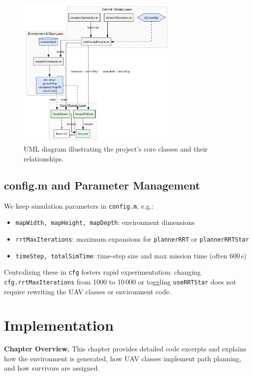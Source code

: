 \documentclass[12pt,a4paper]{report}
\begin{document}
\begin{figure}[H]
    \centering
    \includegraphics[width=0.7\textwidth]{figures/UML.png}
    \caption{UML diagram illustrating the project’s core classes and their relationships.}
    \label{fig:uml}
\end{figure}

\section{config.m and Parameter Management}
We keep simulation parameters in \texttt{config.m}, e.g.:
\begin{itemize}
    \item \texttt{mapWidth, mapHeight, mapDepth}: environment dimensions
    \item \texttt{rrtMaxIterations}: maximum expansions for \texttt{plannerRRT} or \texttt{plannerRRTStar}
    \item \texttt{timeStep, totalSimTime}: time-step size and max mission time (often 600\,s)
\end{itemize}
Centralizing these in \texttt{cfg} fosters rapid experimentation: changing 
\texttt{cfg.rrtMaxIterations} from 1000 to 10\,000 or toggling \texttt{useRRTStar} does 
not require rewriting the UAV classes or environment code.

\chapter{Implementation}
\label{cha:implementation}

\textbf{Chapter Overview.} This chapter provides detailed code excerpts and explains how
the environment is generated, how UAV classes implement path planning, and how survivors
are assigned.
\end{document}
